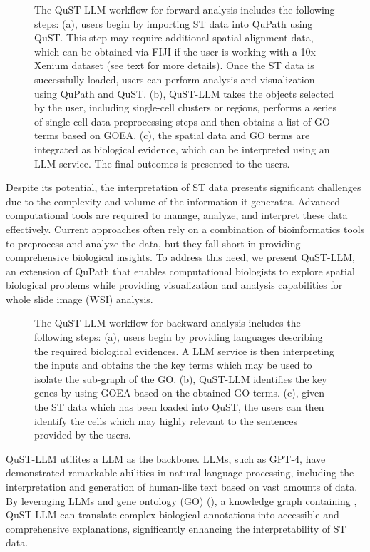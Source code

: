 \documentclass{article}
\begin{document}
\begin{figure}[tb]
	\centering
	\caption{The QuST-LLM workflow for forward analysis includes the following steps: (a), users begin by importing ST data into QuPath using QuST. This step may require additional spatial alignment data, which can be obtained via FIJI if the user is working with a 10x Xenium dataset (see text for more details). Once the ST data is successfully loaded, users can perform analysis and visualization using QuPath and QuST. (b), QuST-LLM takes the objects selected by the user, including single-cell clusters or regions, performs a series of single-cell data preprocessing steps and then obtains a list of GO terms based on GOEA. (c), the spatial data and GO terms are integrated as biological evidence, which can be interpreted using an LLM service. The final outcomes is presented to the users.}
	\label{fig:diagram1}
\end{figure}

Despite its potential, the interpretation of ST data presents significant challenges due to the complexity and volume of the information it generates. Advanced computational tools are required to manage, analyze, and interpret these data effectively. Current approaches often rely on a combination of bioinformatics tools to preprocess and analyze the data, but they fall short in providing comprehensive biological insights. To address this need, we present QuST-LLM, an extension of QuPath that enables computational biologists to explore spatial biological problems while providing visualization and analysis capabilities for whole slide image (WSI) analysis. 

\begin{figure}[tb]
	\centering
	\caption{The QuST-LLM workflow for backward analysis includes the following steps: (a), users begin by providing languages describing the required biological evidences. A LLM service is then interpreting the inputs and obtains the the key terms which may be used to isolate the sub-graph of the GO. (b), QuST-LLM identifies the key genes by using GOEA based on the obtained GO terms. (c), given the ST data which has been loaded into QuST, the users can then identify the cells which may highly relevant to the sentences provided by the users.}
	\label{fig:diagram2}
\end{figure}

QuST-LLM utilites a LLM as the backbone. LLMs, such as GPT-4, have demonstrated remarkable abilities in natural language processing, including the interpretation and generation of human-like text based on vast amounts of data. By leveraging LLMs and gene ontology (GO) (\cite{Ashburner:2000}), a knowledge graph containing , QuST-LLM can translate complex biological annotations into accessible and comprehensive explanations, significantly enhancing the interpretability of ST data.
\end{document}
